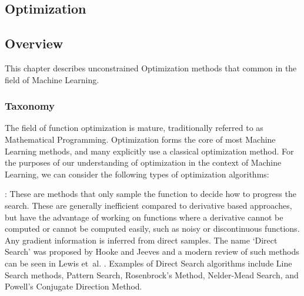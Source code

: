 

\renewcommand{\bibsection}{\subsection{\bibname}}
\begin{bibunit}

\chapter{Optimization}
\label{ch:optimization}

\section{Overview}
This chapter describes unconstrained Optimization methods that common in the field of Machine Learning.

\subsection{Taxonomy}
The field of function optimization is mature, traditionally referred to as Mathematical Programming. Optimization forms the core of most Machine Learning methods, and many explicitly use a classical optimization method. For the purposes of our understanding of optimization in the context of Machine Learning, we can consider the following types of optimization algorithms:


\begin{description}

	\item[Direct Search]: These are methods that only sample the function to decide how to progress the search. These are generally inefficient compared to derivative based approaches, but have the advantage of working on functions where a derivative cannot be computed or cannot be computed easily, such as noisy or discontinuous functions. Any gradient information is inferred from direct samples. The name `Direct Search' was proposed by Hooke and Jeeves \cite{Hooke1961} and a modern review of such methods can be seen in Lewis et~al. \cite{Lewis2000}. Examples of Direct Search algorithms include Line Search methods, Pattern Search, Rosenbrock's Method, Nelder-Mead Search, and Powell's Conjugate Direction Method.


\end{description}
\end{bibunit}
